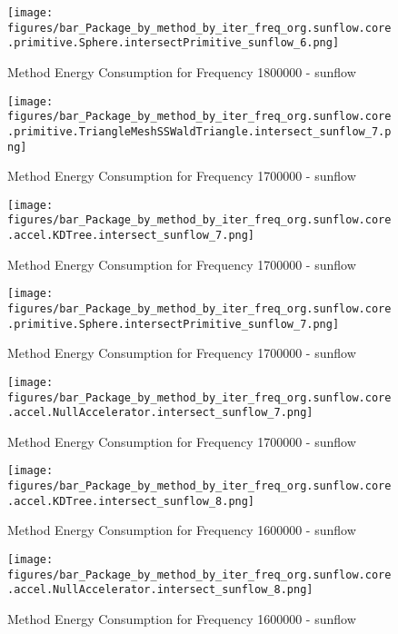 				\begin{figure}[H]
				\centering
				\texttt{[image: figures/bar\_Package\_by\_method\_by\_iter\_freq\_org.sunflow.core.primitive.Sphere.intersectPrimitive\_sunflow\_6.png]}
				\caption{Method Energy Consumption for Frequency 1800000 - sunflow}				
				\end{figure}				
				
				\begin{figure}[H]
				\centering
				\texttt{[image: figures/bar\_Package\_by\_method\_by\_iter\_freq\_org.sunflow.core.primitive.TriangleMeshSSWaldTriangle.intersect\_sunflow\_7.png]}
				\caption{Method Energy Consumption for Frequency 1700000 - sunflow}				
				\end{figure}				
				
				\begin{figure}[H]
				\centering
				\texttt{[image: figures/bar\_Package\_by\_method\_by\_iter\_freq\_org.sunflow.core.accel.KDTree.intersect\_sunflow\_7.png]}
				\caption{Method Energy Consumption for Frequency 1700000 - sunflow}				
				\end{figure}				
				
				\begin{figure}[H]
				\centering
				\texttt{[image: figures/bar\_Package\_by\_method\_by\_iter\_freq\_org.sunflow.core.primitive.Sphere.intersectPrimitive\_sunflow\_7.png]}
				\caption{Method Energy Consumption for Frequency 1700000 - sunflow}				
				\end{figure}				
				
				\begin{figure}[H]
				\centering
				\texttt{[image: figures/bar\_Package\_by\_method\_by\_iter\_freq\_org.sunflow.core.accel.NullAccelerator.intersect\_sunflow\_7.png]}
				\caption{Method Energy Consumption for Frequency 1700000 - sunflow}				
				\end{figure}				
				
				\begin{figure}[H]
				\centering
				\texttt{[image: figures/bar\_Package\_by\_method\_by\_iter\_freq\_org.sunflow.core.accel.KDTree.intersect\_sunflow\_8.png]}
				\caption{Method Energy Consumption for Frequency 1600000 - sunflow}				
				\end{figure}				
				
				\begin{figure}[H]
				\centering
				\texttt{[image: figures/bar\_Package\_by\_method\_by\_iter\_freq\_org.sunflow.core.accel.NullAccelerator.intersect\_sunflow\_8.png]}
				\caption{Method Energy Consumption for Frequency 1600000 - sunflow}				
				\end{figure}				
				
